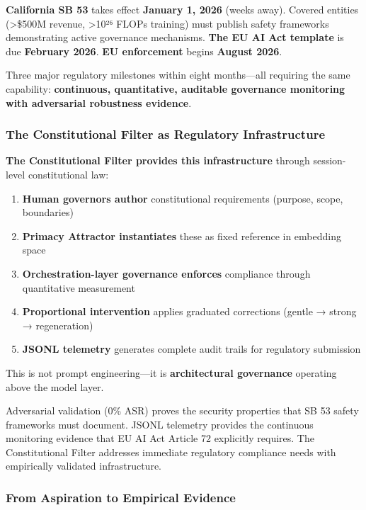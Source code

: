 \textbf{California SB 53} takes effect \textbf{January 1, 2026} (weeks
away). Covered entities (\textgreater\$500M revenue, \textgreater10²⁶
FLOPs training) must publish safety frameworks demonstrating active
governance mechanisms. \textbf{The EU AI Act template} is due
\textbf{February 2026}. \textbf{EU enforcement} begins \textbf{August
2026}.

Three major regulatory milestones within eight months---all requiring
the same capability: \textbf{continuous, quantitative, auditable
governance monitoring with adversarial robustness evidence}.

\subsubsection{The Constitutional Filter as Regulatory
Infrastructure}\label{the-constitutional-filter-as-regulatory-infrastructure}

\textbf{The Constitutional Filter provides this infrastructure} through
session-level constitutional law:

\begin{enumerate}
\def\labelenumi{\arabic{enumi}.}
\tightlist
\item
  \textbf{Human governors author} constitutional requirements (purpose,
  scope, boundaries)
\item
  \textbf{Primacy Attractor instantiates} these as fixed reference in
  embedding space
\item
  \textbf{Orchestration-layer governance enforces} compliance through
  quantitative measurement
\item
  \textbf{Proportional intervention} applies graduated corrections
  (gentle → strong → regeneration)
\item
  \textbf{JSONL telemetry} generates complete audit trails for
  regulatory submission
\end{enumerate}

This is not prompt engineering---it is \textbf{architectural governance}
operating above the model layer.

Adversarial validation (0\% ASR) proves the security properties that SB
53 safety frameworks must document. JSONL telemetry provides the
continuous monitoring evidence that EU AI Act Article 72 explicitly
requires. The Constitutional Filter addresses immediate regulatory
compliance needs with empirically validated infrastructure.

\subsubsection{From Aspiration to Empirical
Evidence}\label{from-aspiration-to-empirical-evidence}

